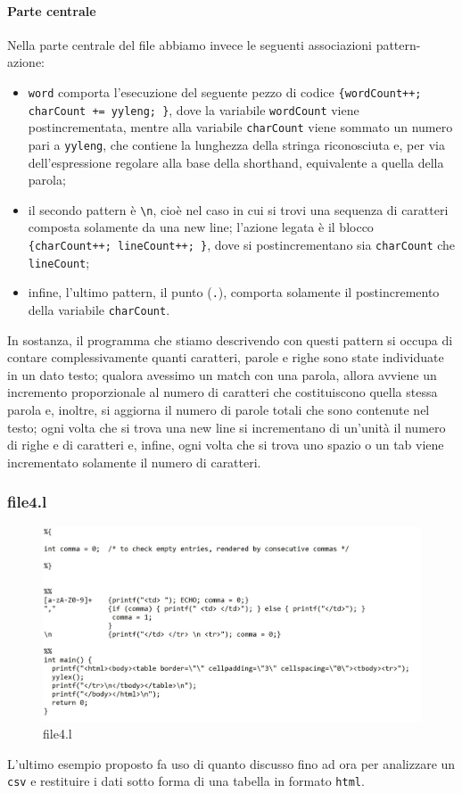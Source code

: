 \documentclass[class=book, crop=false, oneside, 12pt]{standalone}
\begin{document}
\paragraph{Parte centrale}
Nella parte centrale del file abbiamo invece le seguenti associazioni pattern-azione:

\begin{itemize}
    \item \texttt{word} comporta l'esecuzione del seguente pezzo di codice \texttt{\{wordCount++; charCount += yyleng; \}}, dove la variabile \texttt{wordCount} viene postincrementata, mentre alla variabile \texttt{charCount} viene sommato un numero pari a \texttt{yyleng}, che contiene la lunghezza della stringa riconosciuta e, per via dell'espressione regolare alla base della shorthand, equivalente a quella della parola;
    \item il secondo pattern è \texttt{\textbackslash n}, cioè nel caso in cui si trovi una sequenza di caratteri composta solamente da una new line; l'azione legata è il blocco \texttt{\{charCount++; lineCount++; \}}, dove si postincrementano sia \texttt{charCount} che \texttt{lineCount};
    \item infine, l'ultimo pattern, il punto (\texttt{.}), comporta solamente il postincremento della variabile \texttt{charCount}.
\end{itemize}

In sostanza, il programma che stiamo descrivendo con questi pattern si occupa di contare complessivamente quanti caratteri, parole e righe sono state individuate in un dato testo; qualora avessimo un match con una parola, allora avviene un incremento proporzionale al numero di caratteri che costituiscono quella stessa parola e, inoltre, si aggiorna il numero di parole totali che sono contenute nel testo; ogni volta che si trova una new line si incrementano di un'unità il numero di righe e di caratteri e, infine, ogni volta che si trova uno spazio o un tab viene incrementato solamente il numero di caratteri. 

\subsubsection{file4.l}
\begin{figure}[h]
    \centering
    \includegraphics[width=.7\textwidth,keepaspectratio]{file4.l.jpg}
    \caption{file4.l}
    \label{file4.l}
\end{figure}
L'ultimo esempio proposto fa uso di quanto discusso fino ad ora per analizzare un \texttt{csv} e restituire i dati sotto forma di una tabella in formato \texttt{html}.
\end{document}
